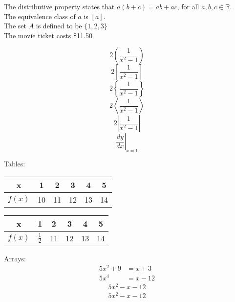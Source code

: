 \documentclass[11pt]{article}
\begin{document}
The distributive property states that $a(b+c)=ab+ac$, for all $a,b,c \in 
\mathbb{R}$.\\[6pt]
The equivalence class of $a$ is $[a]$.\\[6pt]
The set $A$ is defined to be $\{1,2,3\}$\\[6pt]
The movie ticket costs \$11.50

$$2\left(\frac{1}{x^2-1}\right)$$
$$2\left[\frac{1}{x^2-1}\right]$$
$$2\left\{\frac{1}{x^2-1}\right\}$$
$$2\left\langle\frac{1}{x^2-1}\right\rangle$$
$$2\left | \frac{1}{x^2-1}\right |$$
$$\left.\frac{dy}{dx}\right|_{x=1}$$

Tables:\\[6pt]
\begin{tabular}{|c||c|c|c|c|c|}
\hline
x & 1 & 2 & 3 & 4 & 5 \\ \hline
$f(x)$ & 10 & 11 & 12 & 13 & 14 \\ \hline

\end{tabular}

\vspace{1cm}
\begin{table}[H]
\begin{tabular}{|c||c|c|c|c|c|}
\hline
x & 1 & 2 & 3 & 4 & 5 \\ \hline
$f(x)$ & $\frac{1}{2}$ & 11 & 12 & 13 & 14 \\ \hline

\end{tabular}
\end{table}

Arrays:
\begin{align}
5x^2+9&= x+3 \\
5x^4&=x-12
\end{align}
\begin{align}
5x^2-x-12 \\
5x^2-x-12 
\end{align}
\end{document}

